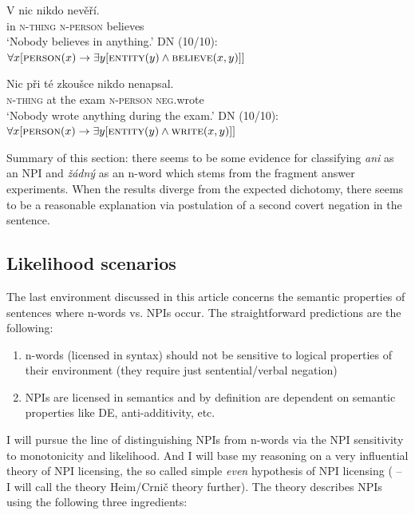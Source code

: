 \documentclass[output=paper,
]{langscibook}
\begin{document}
\ea\label{ex-39}  \gll V nic nikdo nevěří.\\
in \textsc{n-thing} \textsc{n-person} believes\\
\glt `Nobody believes in anything.'
\ex  DN (10/10): $\forall x[\textsc{person}(x) \rightarrow \exists y[\textsc{entity}(y) \wedge \textsc{believe}(x,y)]]$
\z
\z

\ea\label{ex-40} \gll Nic při té zkoušce nikdo nenapsal.\\
\textsc{n-thing} at the exam \textsc{n-person} \textsc{neg}.wrote\\
\glt `Nobody wrote anything during the exam.'
\ex DN (10/10): $\forall x[\textsc{person}(x) \rightarrow \exists y[\textsc{entity}(y) \wedge \textsc{write}(x,y)]]$
\z
\z

\noindent Summary of this section: there seems to be some evidence for classifying \textit{ani} as an NPI and \textit{žádný} as an n-word which stems from the fragment answer experiments. When the results diverge from the expected dichotomy, there seems to be a reasonable explanation via postulation of a second covert negation in the sentence.

\subsection{Likelihood scenarios}\label{likelihood-scenarios}

The last environment discussed in this article concerns the semantic properties of sentences where n-words vs. NPIs occur. The straightforward predictions are the following:

\begin{enumerate}
  \def\labelenumi{\arabic{enumi})}
  \item
    n-words (licensed in syntax) should not be sensitive to logical properties of
    their environment (they require just sentential/verbal negation)
  \item
    NPIs are licensed in semantics and by definition are dependent on semantic properties like DE, anti-additivity, etc.
\end{enumerate}

\noindent I will pursue the line of distinguishing NPIs from n-words via the NPI sensitivity to monotonicity and likelihood. And I will base my reasoning on a very influential theory of NPI licensing, the so called simple
  \textit{even} hypothesis of NPI licensing (\citealt{heim1984note,krifka1995semantics,crnivc2014against} -- I will call the theory Heim/Crnič theory further). The theory describes NPIs using the following three ingredients:
\end{document}
